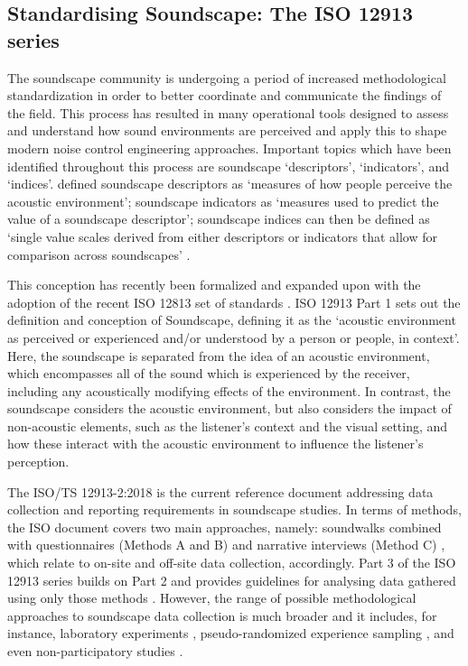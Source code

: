 
\subsection{Standardising Soundscape: The ISO 12913 series}
The soundscape community is undergoing a period of increased methodological standardization in order to better coordinate and communicate the findings of the field. This process has resulted in many operational tools designed to assess and understand how sound environments are perceived and apply this to shape modern noise control engineering approaches. Important topics which have been identified throughout this process are soundscape `descriptors', `indicators', and `indices'. \citet{Aletta2016Soundscape} defined soundscape descriptors as `measures of how people perceive the acoustic environment'; soundscape indicators as `measures used to predict the value of a soundscape descriptor'; soundscape indices can then be defined as `single value scales derived from either descriptors or indicators that allow for comparison across soundscapes' \citep{Kang2019Towards}.

This conception has recently been formalized and expanded upon with the adoption of the recent ISO 12813 set of standards \citep{ISO12913Part1, ISO12913Part2,ISO12913Part3}. ISO 12913 Part 1 sets out the definition and conception of Soundscape, defining it as the `acoustic environment as perceived or experienced and/or understood by a person or people, in context'. Here, the soundscape is separated from the idea of an acoustic environment, which encompasses all of the sound which is experienced by the receiver, including any acoustically modifying effects of the environment. In contrast, the soundscape considers the acoustic environment, but also considers the impact of non-acoustic elements, such as the listener's context and the visual setting, and how these interact with the acoustic environment to influence the listener's perception.

The ISO/TS 12913-2:2018 is the current reference document addressing data collection and reporting requirements in soundscape studies. In terms of methods, the ISO document covers two main approaches, namely: soundwalks combined with questionnaires (Methods A and B) and narrative interviews (Method C) \citep{ISO12913Part2}, which relate to on-site and off-site data collection, accordingly. Part 3 of the ISO 12913 series builds on Part 2 and provides guidelines for analysing data gathered using only those methods \citep{ISO12913Part3}. However, the range of possible methodological approaches to soundscape data collection is much broader and it includes, for instance, laboratory experiments \citep{Aletta2016Soundscape,Sun2019Classification,Oberman2018Towards}, pseudo-randomized experience sampling \citep{Craig2017Experience}, and even non-participatory studies \citep{Lavia2018Non}. 

